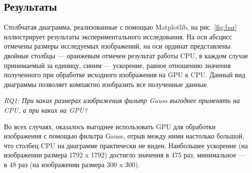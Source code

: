 \subsection{Результаты}

Столбчатая диаграмма, реализованные с помощью Mat\-plot\-lib, на рис. \ref{fig:bar} иллюстрирует результаты экспериментального исследования. На оси абсцисс отмечены размеры исследуемых изображений, на оси ординат представлены двойные столбцы --- оранжевым отмечен результат работы CPU, в каждом случае принимаемый за единицу, синим --- ускорение, равное отношению значения полученного при обработке исходного изображения на GPU к CPU. Данный вид диаграммы позволяет компактно изобразить все полученные данные.

\textit{RQ1: При каких размерах изображения фильтр Gauss выгоднее применять на CPU, а при каких на GPU?}

Во всех случаях, оказалось выгоднее использовать GPU для обработки изображения с помощью фильтра Gauss, отрыв между ними настолько большой, что столбец CPU на диаграмме практически не виден. Наибольшее ускорение (на изображении размера 1792 x 1792) достигло значения в 475 раз, минимальное --- в 48 раз (на изображении размера 300 x 300).
